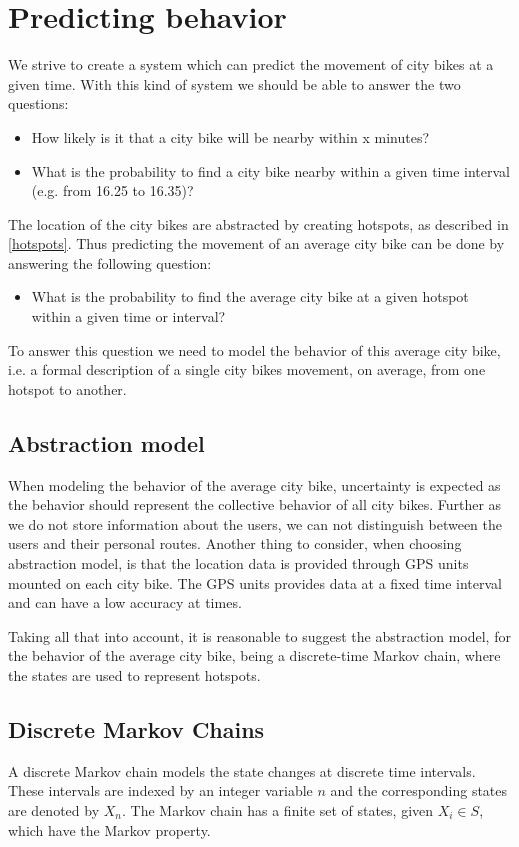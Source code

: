 \section{Predicting behavior}
We strive to create a system which can predict the movement of city bikes at a given time.
With this kind of system we should be able to answer the two questions:
\begin{itemize}
\item How likely is it that a city bike will be nearby within x minutes?
\item What is the probability to find a city bike nearby within a given time interval (e.g. from 16.25 to 16.35)?
\end{itemize}

The location of the city bikes are abstracted by creating hotspots, as described in \cref{hotspots}.
Thus predicting the movement of an average city bike can be done by answering the following question:

\begin{itemize}
\item What is the probability to find the average city bike at a given hotspot within a given time or interval?
\end{itemize}

To answer this question we need to model the behavior of this average city bike, i.e. a formal description of a single city bikes movement, on average, from one hotspot to another.

\subsection{Abstraction model}
When modeling the behavior of the average city bike, uncertainty is expected as the behavior should represent the collective behavior of all city bikes.
Further as we do not store information about the users, we can not distinguish between the users and their personal routes.
Another thing to consider, when choosing abstraction model, is that the location data is provided through GPS units mounted on each city bike.
The GPS units provides data at a fixed time interval and can have a low accuracy at times.

Taking all that into account, it is reasonable to suggest the abstraction model, for the behavior of the average city bike, being a discrete-time Markov chain, where the states are used to represent hotspots.

\subsection{Discrete Markov Chains}\label{markov}
A discrete Markov chain models the state changes at discrete time intervals.
These intervals are indexed by an integer variable $ n $ and the corresponding states are denoted by $ X_n $.
The Markov chain has a finite set of states, given $X_i \in S$, which have the Markov property.

